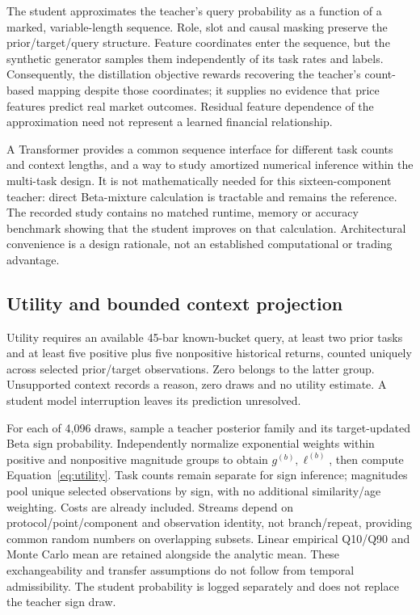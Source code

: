 The student approximates the teacher's query probability as a function
of a marked, variable-length sequence. Role, slot and causal masking
preserve the prior/target/query structure. Feature coordinates enter the
sequence, but the synthetic generator samples them independently of its
task rates and labels. Consequently, the distillation objective rewards
recovering the teacher's count-based mapping despite those coordinates;
it supplies no evidence that price features predict real market outcomes.
Residual feature dependence of the approximation need not represent a
learned financial relationship.

A Transformer provides a common sequence interface for different task
counts and context lengths, and a way to study amortized numerical
inference within the multi-task design. It is not mathematically needed
for this sixteen-component teacher: direct Beta-mixture calculation is
tractable and remains the reference. The recorded study contains no
matched runtime, memory or accuracy benchmark showing that the student
improves on that calculation. Architectural convenience is a design
rationale, not an established computational or trading advantage.

\subsection{Utility and bounded context projection}\label{s:2fde9b3e9d8b15d2}
Utility requires an available 45-bar known-bucket query, at least two
prior tasks and at least five positive plus five nonpositive historical
returns, counted uniquely across selected prior/target observations.
Zero belongs to the latter group. Unsupported context records a reason,
zero draws and no utility estimate. A student model interruption leaves
its prediction unresolved.

For each of 4,096 draws, sample a teacher posterior family and its
target-updated Beta sign probability. Independently normalize exponential
weights within positive and nonpositive magnitude groups to obtain
$g^{(b)},\ell^{(b)}$, then compute Equation~\ref{eq:utility}. Task counts
remain separate for sign inference; magnitudes pool unique selected
observations by sign, with no additional similarity/age weighting.
Costs are already included. Streams depend on protocol/point/component
and observation identity, not branch/repeat, providing common random
numbers on overlapping subsets. Linear empirical Q10/Q90 and Monte Carlo
mean are retained alongside the analytic mean. These exchangeability
and transfer assumptions do not follow from temporal admissibility.
The student probability is logged separately and does not replace the
teacher sign draw.

